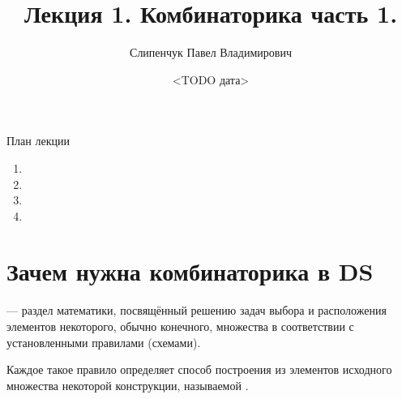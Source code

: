 
  

\title{Лекция 1. Комбинаторика часть 1.}
\date{<TODO дата>}
\author{Слипенчук Павел Владимирович}



  \maketitle
    
  \begin{frame}{План лекции}\label{frame:plan}
    \begin{enumerate}
	\item {}
	\item {}
	\item {}
	\item {}
	\end{enumerate}
 \end{frame}
    
\section{Зачем нужна комбинаторика в DS}\label{section:why_combinatorics}
\begin{frame}
 — раздел математики, посвящённый 
решению задач выбора и расположения элементов некоторого, обычно конечного, множества
в соответствии с установленными правилами (схемами). 

Каждое такое правило определяет способ построения из элементов исходного множества некоторой конструкции, 
называемой . 
\end{frame}


